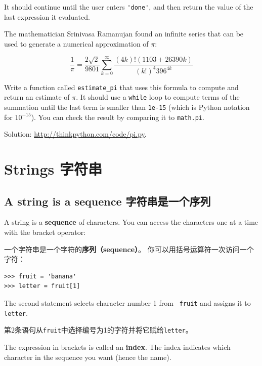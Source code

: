 \documentclass[10pt]{book}
\begin{document}
\begin{CJK}{UTF8}{gbsn}
\begin{exercise}
It should continue until the user enters \verb"'done'", and then
return the value of the last expression it evaluated.

\end{exercise}


\begin{exercise}

The mathematician Srinivasa Ramanujan found an
infinite series
that can be used to generate a numerical
approximation of $\pi$:

\[ \frac{1}{\pi} = \frac{2\sqrt{2}}{9801} 
\sum^\infty_{k=0} \frac{(4k)!(1103+26390k)}{(k!)^4 396^{4k}} \]

Write a function called \verb"estimate_pi" that uses this formula
to compute and return an estimate of $\pi$.  It should use a {\tt while}
loop to compute terms of the summation until the last term is
smaller than {\tt 1e-15} (which is Python notation for $10^{-15}$).
You can check the result by comparing it to {\tt math.pi}.

Solution: \url{http://thinkpython.com/code/pi.py}.

\end{exercise}


\chapter{Strings 字符串}
\label{strings}


\section{A string is a sequence 字符串是一个序列}

A string is a {\bf sequence} of characters.  
You can access the characters one at a time with the
bracket operator:

一个字符串是一个字符的{\bf 序列（sequence）}。
你可以用括号运算符一次访问一个字符：

\begin{verbatim}
>>> fruit = 'banana'
>>> letter = fruit[1]
\end{verbatim}
%
The second statement selects character number 1 from {\tt
fruit} and assigns it to {\tt letter}.  

第2条语句从{\tt fruit}中选择编号为1的字符并将它赋给{\tt letter}。

The expression in brackets is called an {\bf index}.  
The index indicates which character in the sequence you
want (hence the name).


\end{CJK}
\end{document}
